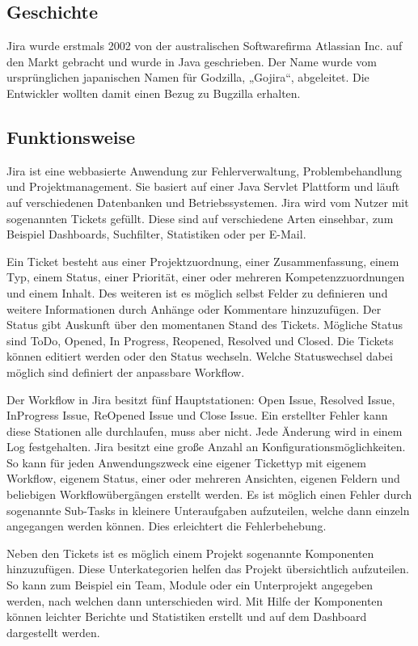 \subsection{Geschichte}
Jira wurde erstmals 2002 von der australischen Softwarefirma Atlassian Inc. auf den Markt gebracht und wurde in Java geschrieben. Der Name wurde vom urspr\"unglichen japanischen Namen f\"ur Godzilla, „Gojira“, abgeleitet. Die Entwickler wollten damit einen Bezug zu Bugzilla erhalten.

\subsection{Funktionsweise}
Jira ist eine webbasierte Anwendung zur Fehlerverwaltung, Problembehandlung und Projektmanagement. Sie basiert auf einer Java Servlet Plattform und l\"auft auf verschiedenen Datenbanken und Betriebssystemen. Jira wird vom Nutzer mit sogenannten Tickets gef\"ullt. Diese sind auf verschiedene Arten einsehbar, zum Beispiel Dashboards, Suchfilter, Statistiken oder per E-Mail.

Ein Ticket besteht aus einer Projektzuordnung, einer Zusammenfassung, einem Typ, einem Status, einer Priorit\"at, einer oder mehreren Kompetenzzuordnungen und einem Inhalt. Des weiteren ist es m\"oglich selbst Felder zu definieren und weitere Informationen durch Anh\"ange oder Kommentare hinzuzuf\"ugen. Der Status gibt Auskunft \"uber den momentanen Stand des Tickets. M\"ogliche Status sind ToDo, Opened, In Progress, Reopened, Resolved und Closed. Die Tickets k\"onnen editiert werden oder den Status wechseln. Welche Statuswechsel dabei m\"oglich sind definiert der anpassbare Workflow.

Der Workflow in Jira besitzt f\"unf Hauptstationen: Open Issue, Resolved Issue, InProgress Issue, ReOpened Issue und Close Issue. Ein erstellter Fehler kann diese Stationen alle durchlaufen, muss aber nicht. 
Jede \"Anderung wird in einem Log festgehalten. Jira besitzt eine große Anzahl an Konfigurationsm\"oglichkeiten. So kann f\"ur jeden Anwendungszweck eine eigener Tickettyp mit eigenem Workflow, eigenem Status, einer oder mehreren Ansichten, eigenen Feldern und beliebigen Workflow\"uberg\"angen erstellt werden.
Es ist m\"oglich einen Fehler durch sogenannte Sub-Tasks in kleinere Unteraufgaben aufzuteilen, welche dann einzeln angegangen werden k\"onnen. Dies erleichtert die Fehlerbehebung.

Neben den Tickets ist es m\"oglich einem Projekt sogenannte Komponenten hinzuzuf\"ugen. Diese Unterkategorien helfen das Projekt \"ubersichtlich aufzuteilen. So kann zum Beispiel ein Team, Module oder ein Unterprojekt angegeben werden, nach welchen dann unterschieden wird. Mit Hilfe der Komponenten k\"onnen leichter Berichte und Statistiken erstellt und auf dem Dashboard dargestellt werden.
 
